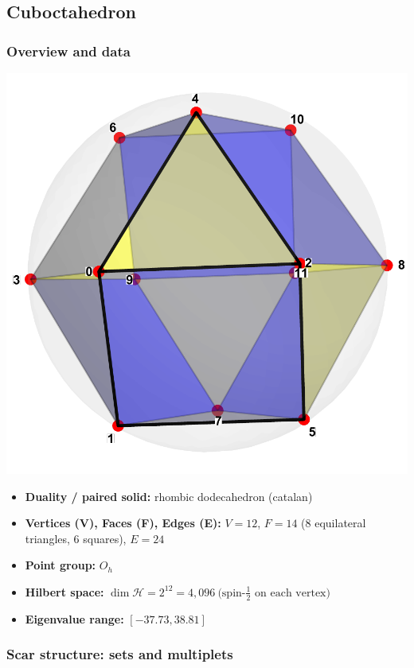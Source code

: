 \documentclass[11pt,a4paper]{article}
\begin{document}

\subsection*{Cuboctahedron}

\subsubsection*{Overview and data}
\begin{center}
  \includegraphics[width=.6\linewidth]{cuboctahedron}
\end{center}

\begin{itemize}[leftmargin=1.5em]
  \item \textbf{Duality / paired solid:} rhombic dodecahedron (catalan)
  \item \textbf{Vertices (V), Faces (F), Edges (E):} $V = 12$,\; $F = 14$ (8 equilateral triangles, 6 squares),\; $E = 24$
  \item \textbf{Point group:} $O_h$
  \item \textbf{Hilbert space:} \(
        \dim\mathcal{H} = 2^{12} = 4,096\ \text{(spin-$\tfrac12$ on each vertex)}
        \)
  \item \textbf{Eigenvalue range:} $[-37.73, 38.81]$
\end{itemize}

\subsubsection*{Scar structure: sets and multiplets}
\end{document}

